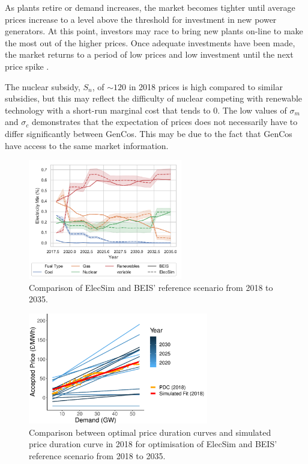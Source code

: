 As plants retire or demand increases, the market becomes tighter until average prices increase to a level above the threshold for investment in new power generators. At this point, investors may race to bring new plants on-line to make the most out of the higher prices. Once adequate investments have been made, the market returns to a period of low prices and low investment until the next price spike \cite{Gross2007}. 


The nuclear subsidy, $S_n$, of ${\sim}$\textsterling $120$ in 2018 prices is high compared to similar subsidies, but this may reflect the difficulty of nuclear competing with renewable technology with a short-run marginal cost that tends to \textsterling $0$. The low values of $\sigma_m$ and $\sigma_c$ demonstrates that the expectation of prices does not necessarily have to differ significantly between GenCos. This may be due to the fact that GenCos have access to the same market information.


\begin{figure}
	\centering
	\includegraphics[width=0.60\textwidth]{Chapter4/figures/e-Energy-2020/results/scenario_analysis/best_forward_scenario_below_legend.pdf}
	\caption{Comparison of ElecSim and BEIS' reference scenario from 2018 to 2035.}
	\label{fig:forward_scenario_beis_elecsim}
\end{figure}



\begin{figure}
	\centering
	\includegraphics[width=0.7\textwidth, keepaspectratio]{Chapter4/figures/e-Energy-2020/results/scenario_analysis/optimal_pdc_prices.pdf}
	\caption{Comparison between optimal price duration curves and simulated price duration curve in 2018 for optimisation of ElecSim and BEIS' reference scenario from 2018 to 2035.}
	\label{fig:forward_scenario_best_pdcs}
\end{figure}


